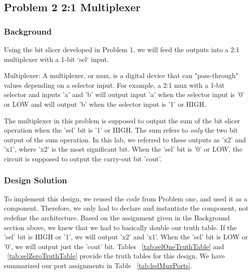 \documentclass[11pt]{article}
\begin{document}
\subsection{Problem 2 2:1 Multiplexer}

\subsubsection{Background}
Using the bit slicer developed in Problem 1, we will feed the outputs into a 2:1 multiplexer with a 1-bit `sel` input. 

\begin{definition}
	Multiplexer: A multiplexer, or mux, is a digital device that can "pass-through" values depending on a selector input. For example, a 2:1 mux with a 1-bit selector and inputs 'a' and 'b' will output input 'a' when the selector input is '0' or LOW and will output 'b' when the selector input is '1' or HIGH.
\end{definition}

The multiplexer in this problem is supposed to output the sum of the bit slicer operation when the 'sel' bit is '1' or HIGH. The sum refers to \textit{only} the two bit output of the sum operation. In this lab, we referred to these outputs as 'x2' and 'x1', where 'x2' is the most significant bit. When the 'sel' bit is '0' or LOW, the circuit is supposed to output the carry-out bit 'cout'. 

\subsubsection{Design Solution}
To implement this design, we reused the code from Problem one, and used it as a component. Therefore, we only had to declare and instantiate the component, not redefine the architecture. Based on the assignment given in the Background section above, we knew that we had to basically double our truth table. If the 'sel' bit is HIGH or '1', we will output 'x2' and 'x1'. When the 'sel' bit is LOW or '0', we will output just the 'cout' bit. Tables ~\ref{tab:selOneTruthTable} and ~\ref{tab:selZeroTruthTable} provide the truth tables for this design. We have summarized our port assignments in Table ~\ref{tab:ledMuxPorts}.
\end{document}
